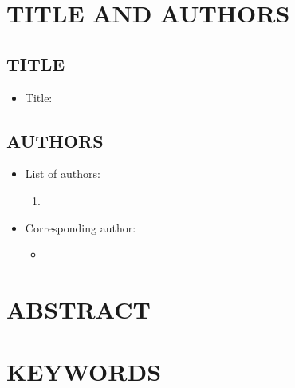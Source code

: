 \documentclass[12pt,english]{article}
\begin{document}

\setcounter{page}{1}

\section*{TITLE AND AUTHORS}
\subsection*{TITLE}
\begin{itemize}[label={}, leftmargin=*]
    \item Title: \textbf{\PAPERTITLE}
\end{itemize}
\subsection*{AUTHORS}
\begin{itemize}[label={}, leftmargin=*]
    \item List of authors:
    \begin{enumerate}
        \item \AUTHORHADAHINFO
    \end{enumerate}
    \item Corresponding author:
    \begin{itemize}
        \item \textbf{\AUTHORHADAHINFO}
    \end{itemize}
\end{itemize}
\clearpage 

\doublespacing
\section*{ABSTRACT}
\PAPERABSTRACT
\clearpage 

\doublespacing
\section*{KEYWORDS}
\PAPERKEYWORDS
\clearpage 

\end{document}
